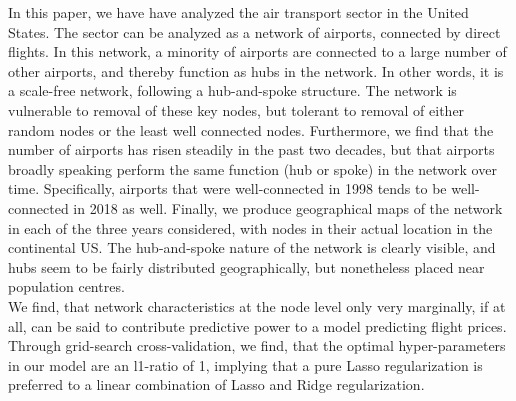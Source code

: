 \label{sec:conclusion}
In this paper, we have have analyzed the air transport sector in the United States. The sector can be analyzed as a network of airports, connected by direct flights. In this network, a minority of airports are connected to a large number of other airports, and thereby function as hubs in the network. In other words, it is a scale-free network, following a hub-and-spoke structure. The network is vulnerable to removal of these key nodes, but tolerant to removal of either random nodes or the least well connected nodes. Furthermore, we find that the number of airports has risen steadily in the past two decades, but that airports broadly speaking perform the same function (hub or spoke) in the network over time. Specifically, airports that were well-connected in 1998 tends to be well-connected in 2018 as well. Finally, we produce geographical maps of the network in each of the three years considered, with nodes in their actual location in the continental US. The hub-and-spoke nature of the network is clearly visible, and hubs seem to be fairly distributed geographically, but nonetheless placed near population centres. \\
We find, that network characteristics at the node level only very marginally, if at all, can be said to contribute predictive power to a model predicting flight prices. \\ 
Through grid-search cross-validation, we find, that the optimal hyper-parameters in our model are an l1-ratio of 1, implying that a pure Lasso regularization is preferred to a linear combination of Lasso and Ridge regularization. \\
